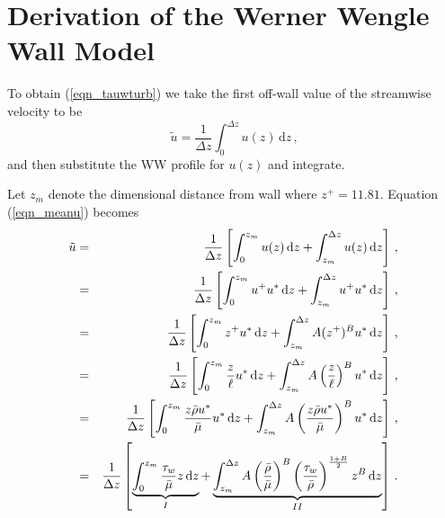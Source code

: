\chapter{Derivation of the Werner Wengle Wall Model}
\label{app_WWderivation}

To obtain (\ref{eqn_tauwturb}) we take the first off-wall value of the streamwise velocity to be
\begin{equation}
\label{eqn_meanu}
\tilde{u} = \frac{1}{\Delta z} \int_0^{\Delta z} u(z) \,\mbox{d}z \,\mbox{,}
\end{equation}
and then substitute the WW profile for $u(z)$ and integrate.

Let $z_m$ denote the dimensional distance from wall where $z^+ = 11.81$.  Equation (\ref{eqn_meanu}) becomes
\begin{eqnarray}
\label{eqn_uint}
\tilde{u} &=& \frac{1}{\Delta z} \left[ \int_0^{z_m} u(z) \,\mbox{d}z + \int_{z_m}^{\Delta z} u(z) \,\mbox{d}z \right] \,\mbox{,} \nonumber\vspace{0.2cm}\\
&=& \frac{1}{\Delta z} \left[ \int_0^{z_m} u^+ u^* \,\mbox{d}z + \int_{z_m}^{\Delta z} u^+ u^* \,\mbox{d}z \right] \,\mbox{,} \nonumber\vspace{0.2cm}\\
&=& \frac{1}{\Delta z} \left[ \int_0^{z_m} z^+ u^* \,\mbox{d}z + \int_{z_m}^{\Delta z} A(z^+)^B u^* \,\mbox{d}z \right] \,\mbox{,} \nonumber\vspace{0.2cm}\\
&=& \frac{1}{\Delta z} \left[ \int_0^{z_m} \frac{z}{\ell} u^* \,\mbox{d}z + \int_{z_m}^{\Delta z} A\left(\frac{z}{\ell}\right)^B u^* \,\mbox{d}z \right] \,\mbox{,} \nonumber\vspace{0.2cm}\\
&=& \frac{1}{\Delta z} \left[ \int_0^{z_m} \frac{z\bar{\rho}u^*}{\bar{\mu}} u^* \,\mbox{d}z + \int_{z_m}^{\Delta z} A\left(\frac{z\bar{\rho}u^*}{\bar{\mu}}\right)^B u^* \,\mbox{d}z \right] \,\mbox{,} \nonumber\vspace{0.2cm}\\
&=& \frac{1}{\Delta z} \left[ \underbrace{\int_0^{z_m} \frac{\tau_w}{\bar{\mu}} z\,\mbox{d}z}_{I} + \underbrace{\int_{z_m}^{\Delta z} A\left(\frac{\bar{\rho}}{\bar{\mu}}\right)^B \left(\frac{\tau_w}{\bar{\rho}}\right)^{\frac{1+B}{2}} z^B\,\mbox{d}z}_{II} \right] \,\mbox{.}
\end{eqnarray}

